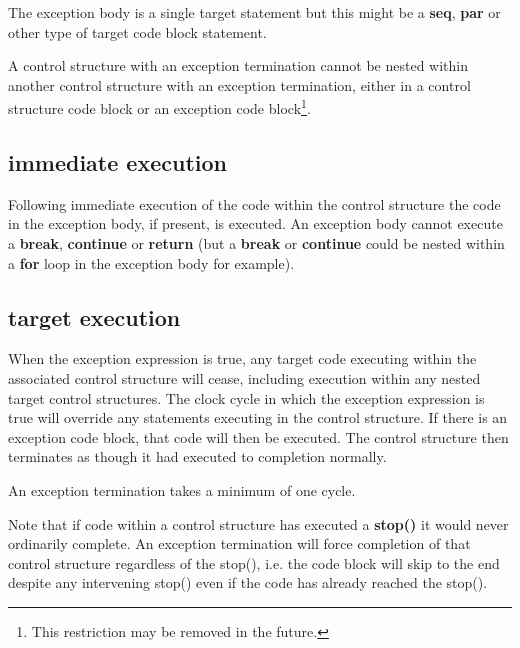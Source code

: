         The exception body is a single target statement but this might be a
        {\bf seq}, {\bf par} or other type of target code block statement.
                
        A control structure with an exception termination cannot be nested
        within another control structure with an exception termination, either
        in a control structure code block or an exception code block\footnote{
        This restriction may be removed in the future.}.
        
        \subsection{immediate execution}
        
            Following immediate execution of the code within the control structure
            the code in the exception body, if present, is executed. An exception
            body cannot execute a {\bf break}, {\bf continue} or {\bf return} (but
            a {\bf break} or {\bf continue} could be nested within a {\bf for} loop
            in the exception body for example).
        
        \subsection{target execution}
        
            When the exception expression is true, any target code executing
            within the associated control structure will cease, including
            execution within any nested target control structures. The clock
            cycle in which the exception expression is true will override any
            statements executing in the control structure. If there is an
            exception code block, that code will then be executed. The control
            structure then terminates as though it had executed to completion
            normally.

            An exception termination takes a minimum of one cycle.

            Note that if code within a control structure has executed a {\bf
            stop()} it would never ordinarily complete. An exception termination
            will force completion of that control structure regardless of the
            stop(), i.e. the code block will skip to the end despite any
            intervening stop() even if the code has already reached the stop().


